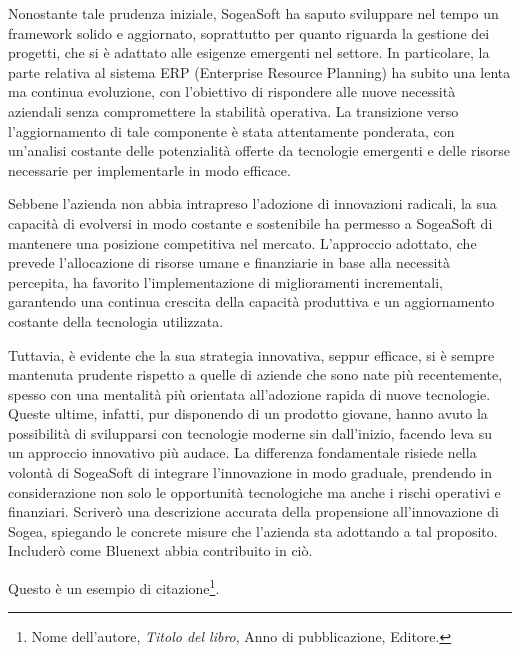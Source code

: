 Nonostante tale prudenza iniziale, SogeaSoft ha saputo sviluppare nel tempo un framework solido e aggiornato, soprattutto per quanto riguarda la gestione dei progetti, che si è adattato alle esigenze emergenti nel settore. In particolare, la parte relativa al sistema ERP (Enterprise Resource Planning) ha subito una lenta ma continua evoluzione, con l'obiettivo di rispondere alle nuove necessità aziendali senza compromettere la stabilità operativa. La transizione verso l'aggiornamento di tale componente è stata attentamente ponderata, con un'analisi costante delle potenzialità offerte da tecnologie emergenti e delle risorse necessarie per implementarle in modo efficace.

Sebbene l'azienda non abbia intrapreso l'adozione di innovazioni radicali, la sua capacità di evolversi in modo costante e sostenibile ha permesso a SogeaSoft di mantenere una posizione competitiva nel mercato. L'approccio adottato, che prevede l'allocazione di risorse umane e finanziarie in base alla necessità percepita, ha favorito l'implementazione di miglioramenti incrementali, garantendo una continua crescita della capacità produttiva e un aggiornamento costante della tecnologia utilizzata. 

Tuttavia, è evidente che la sua strategia innovativa, seppur efficace, si è sempre mantenuta prudente rispetto a quelle di aziende che sono nate più recentemente, spesso con una mentalità più orientata all'adozione rapida di nuove tecnologie. Queste ultime, infatti, pur disponendo di un prodotto giovane, hanno avuto la possibilità di svilupparsi con tecnologie moderne sin dall'inizio, facendo leva su un approccio innovativo più audace. La differenza fondamentale risiede nella volontà di SogeaSoft di integrare l'innovazione in modo graduale, prendendo in considerazione non solo le opportunità tecnologiche ma anche i rischi operativi e finanziari.
    Scriverò una descrizione accurata della propensione all’innovazione di Sogea, spiegando le concrete
    misure che l’azienda sta adottando a tal proposito. Includerò come Bluenext abbia contribuito in ciò.

    Questo è un esempio di citazione\footnote{\small Nome dell'autore, \emph{Titolo del libro}, Anno di pubblicazione, Editore.}.

